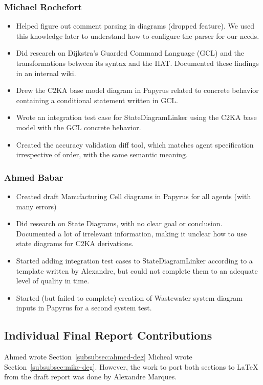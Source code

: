 \subsubsection{Michael Rochefort}
\begin{itemize}
    \item Helped figure out comment parsing in diagrams (dropped feature).
    We used this knowledge later to understand how to configure the parser for our needs.
    \item Did research on Dijkstra's Guarded Command Language (GCL) and the transformations between its syntax and the IIAT.
    Documented these findings in an internal wiki.
    \item Drew the C2KA base model diagram in Papyrus related to concrete behavior containing a conditional statement written in GCL.
    \item Wrote an integration test case for StateDiagramLinker using the C2KA base model with the GCL concrete behavior.
    \item Created the accuracy validation diff tool, which matches agent specification irrespective of order, with the same semantic meaning.
\end{itemize}

\subsubsection{Ahmed Babar}
\begin{itemize}
    \item Created draft Manufacturing Cell diagrams in Papyrus for all agents (with many errors)
    \item Did research on State Diagrams, with no clear goal or conclusion.
    Documented a lot of irrelevant information, making it unclear how to use state diagrams for C2KA derivations.
    \item Started adding integration test cases to StateDiagramLinker according to a template written by Alexandre,
    but could not complete them to an adequate level of quality in time.
    \item Started (but failed to complete) creation of Wastewater system diagram inputs in Papyrus for a second system test.
\end{itemize}

\subsection{Individual Final Report Contributions}\label{subsec:individual-final-report-contributions}
Ahmed wrote Section~\ref{subsubsec:ahmed-deg}
Micheal wrote Section~\ref{subsubsec:mike-deg}.
However, the work to port both sections to LaTeX from the draft report was done by Alexandre Marques.

